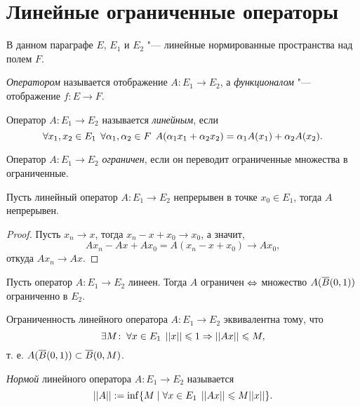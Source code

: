 \documentclass[main]{subfiles}
\begin{document}
\section{Линейные ограниченные операторы}

В данном параграфе \( E \), \( E_1 \) и \( E_2 \) "---
линейные нормированные пространства над
полем \( F \).

\begin{definition}
  \emph{Оператором} называется отображение
  \( A : E_1 \to E_2 \), а \emph{функционалом} "---
  отображение \( f : E \to F \).
\end{definition}

\begin{definition}
  Оператор \( A : E_1 \to E_2 \) называется \emph{линейным},
  если
  \[
    \forall {x_1, x_2 \in E_1} \; \,
    \forall {\alpha_1, \alpha_2 \in F} \; \,
    A(\alpha_1 x_1 + \alpha_2 x_2) =
    \alpha_1 A(x_1) + \alpha_2 A(x_2).
  \]
\end{definition}

\begin{definition}
  Оператор \( A : E_1 \to E_2 \)
  \emph{ограничен},
  если он переводит ограниченные
  множества в ограниченные.
\end{definition}

\begin{proposition}
  Пусть линейный оператор \( A : E_1 \to E_2 \)
  непрерывен в точке \( x_0 \in E_1 \),
  тогда \( A \) непрерывен.
\end{proposition}
\begin{proof}
  Пусть \( x_n \to x \), тогда \( x_n - x + x_0 \to x_0 \),
  а значит,
  \[ A x_n - A x + A x_0 = A(x_n - x + x_0) \to A x_0, \]
  откуда \( A x_n \to A x \).
\end{proof}

\begin{proposition}
  Пусть оператор \( A : E_1 \to E_2 \) линеен.
  Тогда \( A \) ограничен \( \Leftrightarrow \) множество
  \( A(\overline{B}(0, 1)) \) ограниченно в \( E_2 \).
\end{proposition}

\begin{corollary}
  Ограниченность линейного оператора
  \( A : E_1 \to E_2 \) эквивалентна
  тому, что
  \[
    \exists M \colon \: \forall {x \in E_1} \; \, ||x|| \leqslant 1 \Rightarrow ||Ax|| \leqslant M,
  \]
  т. е. \( A(\overline{B}(0, 1)) \subset \overline{B}(0, M) \).
\end{corollary}

\begin{definition}
  \emph{Нормой} линейного оператора
  \( A : E_1 \to E_2 \) называется
  \[
    ||A|| := \inf \{
      M \mid \forall {x \in E_1} \; \, ||Ax|| \leqslant M ||x||
    \}.
  \]
\end{definition}
\end{document}
